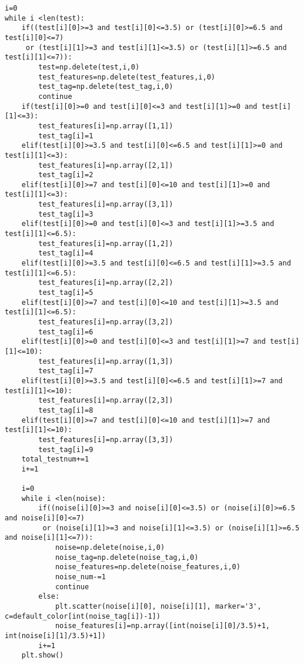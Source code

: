 \documentclass{article}
\begin{document}
\begin{verbatim}
i=0
while i <len(test):
    if((test[i][0]>=3 and test[i][0]<=3.5) or (test[i][0]>=6.5 and test[i][0]<=7)
     or (test[i][1]>=3 and test[i][1]<=3.5) or (test[i][1]>=6.5 and test[i][1]<=7)):
        test=np.delete(test,i,0)
        test_features=np.delete(test_features,i,0)
        test_tag=np.delete(test_tag,i,0)
        continue
    if(test[i][0]>=0 and test[i][0]<=3 and test[i][1]>=0 and test[i][1]<=3):
        test_features[i]=np.array([1,1])
        test_tag[i]=1
    elif(test[i][0]>=3.5 and test[i][0]<=6.5 and test[i][1]>=0 and test[i][1]<=3):
        test_features[i]=np.array([2,1])
        test_tag[i]=2
    elif(test[i][0]>=7 and test[i][0]<=10 and test[i][1]>=0 and test[i][1]<=3):
        test_features[i]=np.array([3,1])
        test_tag[i]=3
    elif(test[i][0]>=0 and test[i][0]<=3 and test[i][1]>=3.5 and test[i][1]<=6.5):
        test_features[i]=np.array([1,2])
        test_tag[i]=4
    elif(test[i][0]>=3.5 and test[i][0]<=6.5 and test[i][1]>=3.5 and test[i][1]<=6.5):
        test_features[i]=np.array([2,2])
        test_tag[i]=5
    elif(test[i][0]>=7 and test[i][0]<=10 and test[i][1]>=3.5 and test[i][1]<=6.5):
        test_features[i]=np.array([3,2])
        test_tag[i]=6
    elif(test[i][0]>=0 and test[i][0]<=3 and test[i][1]>=7 and test[i][1]<=10):
        test_features[i]=np.array([1,3])
        test_tag[i]=7
    elif(test[i][0]>=3.5 and test[i][0]<=6.5 and test[i][1]>=7 and test[i][1]<=10):
        test_features[i]=np.array([2,3])
        test_tag[i]=8
    elif(test[i][0]>=7 and test[i][0]<=10 and test[i][1]>=7 and test[i][1]<=10):
        test_features[i]=np.array([3,3])
        test_tag[i]=9
    total_testnum+=1
    i+=1
    
    i=0
    while i <len(noise):
        if((noise[i][0]>=3 and noise[i][0]<=3.5) or (noise[i][0]>=6.5 and noise[i][0]<=7)
         or (noise[i][1]>=3 and noise[i][1]<=3.5) or (noise[i][1]>=6.5 and noise[i][1]<=7)):
            noise=np.delete(noise,i,0)
            noise_tag=np.delete(noise_tag,i,0)
            noise_features=np.delete(noise_features,i,0)
            noise_num-=1
            continue
        else:
            plt.scatter(noise[i][0], noise[i][1], marker='3', c=default_color[int(noise_tag[i])-1])
            noise_features[i]=np.array([int(noise[i][0]/3.5)+1, int(noise[i][1]/3.5)+1])
        i+=1
    plt.show()
\end{verbatim}
\end{document}
